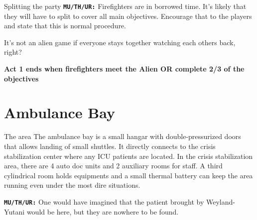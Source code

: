 \begin{rpg-commentbox}{Splitting the party}
    \texttt{\textbf{MU/TH/UR:}} Firefighters are in borrowed time. It's likely that they will have to split to cover all main objectives. Encourage that to the players and state that this is normal procedure. 

    It's not an alien game if everyone stays together watching each others back, right?
\end{rpg-commentbox}  

\begin{rpg-commentbox}{}
    \textbf{Act 1 ends when firefighters meet the Alien OR complete 2/3 of the objectives}
 \end{rpg-commentbox}

 \newsect


\section{Ambulance Bay}

\begin{rpg-commentbox}{The area}
    The ambulance bay is a small hangar with double-pressurized doors that allows landing of small shuttles. 
    It directly connects to the crisis stabilization center where any ICU patients are located. In the crisis stabilization area, there are 4 auto doc units and 2 auxiliary rooms for staff. A third 
    cylindrical room holds equipments and a small thermal battery can keep the area running even under the most dire situations.
    
    \texttt{\textbf{MU/TH/UR:}} One would have imagined that the patient brought by Weyland-Yutani would be here, but they are nowhere to be found.
\end{rpg-commentbox}  




